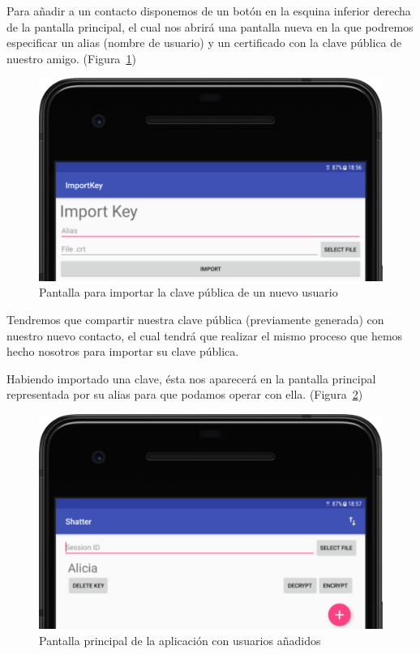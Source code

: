 Para añadir a un contacto disponemos de un botón en la esquina inferior derecha
de la pantalla principal, el cual nos abrirá una pantalla nueva en la que
podremos especificar un alias (nombre de usuario) y un certificado con la clave
pública de nuestro amigo. (Figura~\ref{fig:import})

\begin{figure}[ht]
  \centering
  \includegraphics[scale=0.4]{Figures/import}
  \decoRule
  \caption[Shatter (Importar clave pública)]{Pantalla para importar la clave
  pública de un nuevo usuario}
  \label{fig:import}
\end{figure}

Tendremos que compartir nuestra clave pública (previamente generada) con
nuestro nuevo contacto, el cual tendrá que realizar el mismo proceso que hemos
hecho nosotros para importar su clave pública.

Habiendo importado una clave, ésta nos aparecerá en la pantalla principal
representada por su alias para que podamos operar con ella.
(Figura~\ref{fig:home_2})

\begin{figure}[ht]
  \centering
  \includegraphics[scale=0.4]{Figures/home_2}
  \decoRule
  \caption[Shatter (Pantalla principal con usuarios)]{Pantalla principal de la
  aplicación con usuarios añadidos}
  \label{fig:home_2}
\end{figure}

